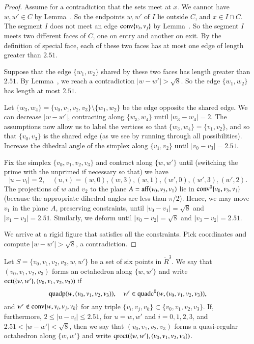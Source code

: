 \begin{proof}  Assume for a contradiction that the sets meet at $x$.
We cannot have $w,w'\in C$ by
Lemma~.  So the endpoints $w,w'$ of $I$
lie outside $C$, and  $x\in I\cap C$.
The segment $I$ does not meet an edge ${\operatorname{conv}}\{v_i,v_j\}$
by Lemma~.  So the segment $I$ meets
two different faces of $C$, one on entry and another on exit.
By the definition of special face, each of these two faces has at most
one edge of length greater than $2.51$.  

Suppose that the edge $\{w_1,w_2\}$
shared by these two faces has length greater
than $2.51$.  By Lemma~, 
we reach a contradiction $|w-w'|>\sqrt8$.
So the edge $\{w_1,w_2\}$ has length at most $2.51$.

Let $\{w_3,w_4\} = \{v_0,v_1,v_2,v_3\}\setminus \{w_1,w_2\}$ be the
edge opposite the shared edge.  We can decrease $|w-w'|$, contracting
along $\{w_3,w_4\}$ until $|w_3-w_4|=2$.  The assumptions now allow
us to label the vertices so that $\{w_3,w_4\}=\{v_1,v_2\}$, and so
that
$\{v_0,v_3\}$ is the shared edge (as we see by running through
all possibilities).  Increase the dihedral angle
of the simplex along $\{v_1,v_2\}$ until $|v_0-v_3|=2.51$.

Fix the simplex $\{v_0,v_1,v_2,v_3\}$ and contract along $\{w,w'\}$
until (switching the prime with the unprimed if necessary so that) we have
  $$
  |u-v_i| = 2,\quad (u,i)=(w,0),(w,3),(w,1), (w',0), (w',3),(w',2).
  $$
The projections of $w$ and $v_2$ to the plane $A={\operatorname{aff}}(v_0,v_3,v_1)$
lie in ${\operatorname{conv}}^0\{v_0,v_3,v_1\}$ (because the appropriate dihedral
angles are less than $\pi/2$).  Hence, we may move
$v_1$ in the plane $A$, preserving constraints,
until $|v_0-v_1|=\sqrt8$ and $|v_1-v_3|=2.51$.
Similarly, we deform until $|v_0-v_2|=\sqrt8$ and $|v_3-v_2|=2.51$.

We arrive at a rigid figure that satisfies all the constraints.
Pick coordinates and compute $|w-w'| > \sqrt8$, a contradiction.
\end{proof}

\newpage

\begin{definition}[octahedron]
Let $S=\{v_0,v_1,v_2,v_3,w,w'\}$ be a set of six points in $\ring{R}^3$.
We say that $(v_0,v_1,v_2,v_3)$ forms an octahedron along $\{w,w'\}$ and write
${\operatorname{oct}}(\{w,w'\},(v_0,v_1,v_2,v_3))$ if
$$
  {\operatorname{quadp}}(w,(v_0,v_1,v_2,v_3)),\quad
   w'\in{\operatorname{quadc}}^0(w,(v_0,v_1,v_2,v_3)),
$$
and $w'\not\in{\operatorname{conv}}\{w,v_i,v_j,v_k\}$ for any triple
$\{v_i,v_j,v_k\}\subset \{v_0,v_1,v_2,v_3\}$.
If, furthermore, $2\le |u-v_i|\le 2.51$, for $u=w,w'$ and $i=0,1,2,3$,
and $2.51<|w-w'|<\sqrt8$, then we say that 
$(v_0,v_1,v_2,v_3)$ forms a quasi-regular octahedron along
 $\{w,w'\}$ and write
${\operatorname{qroct}}(\{w,w'\},(v_0,v_1,v_2,v_3))$.
\end{definition}


